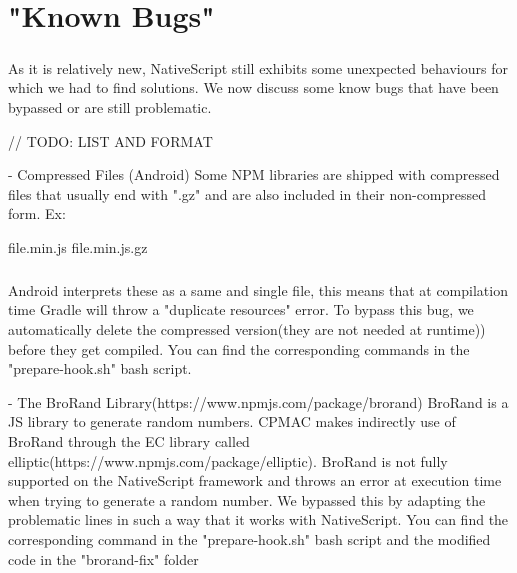 \chapter{"Known Bugs"}

\paragraph{}
As it is relatively new, NativeScript still exhibits some unexpected behaviours for which we had to find solutions. We now discuss some know bugs that have been bypassed or are still problematic.

// TODO: LIST AND FORMAT

- Compressed Files (Android)
Some NPM libraries are shipped with compressed files that usually end with ".gz" and are also included in their non-compressed form.  Ex:

    file.min.js
    file.min.js.gz
    
\paragraph{}
Android interprets these as a same and single file, this means that at compilation time Gradle will throw a "duplicate resources" error. To bypass this bug, we automatically delete the compressed version(they are not needed at runtime)) before they get compiled. You can find the corresponding commands in the "prepare-hook.sh" bash script.

- The BroRand Library(https://www.npmjs.com/package/brorand)
BroRand is a JS library to generate random numbers. CPMAC makes indirectly use of BroRand through the EC library called elliptic(https://www.npmjs.com/package/elliptic). BroRand is not fully supported on the NativeScript framework and throws an error at execution time when trying to generate a random number. We bypassed this by adapting the problematic lines in such a way that it works with NativeScript. You can find the corresponding command in the "prepare-hook.sh" bash script and the modified code in the "brorand-fix" folder

